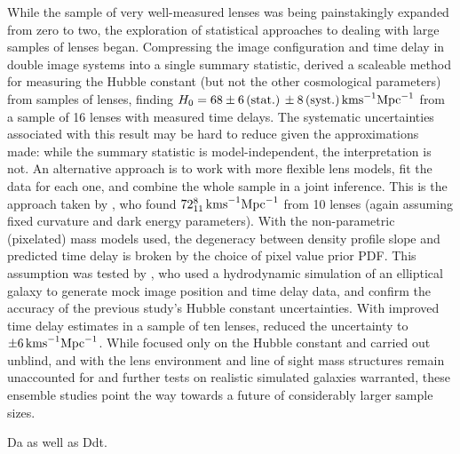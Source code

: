 While the sample of very well-measured lenses was being painstakingly
expanded from zero to two, the exploration of statistical approaches to
dealing with large samples of lenses began.  Compressing the image
configuration and time delay in double image systems into a single
summary statistic, \citet{Ogu07b} derived a scaleable  method for
measuring the Hubble constant (but not the other cosmological
parameters) from samples of lenses, finding
$H_0=68\pm6\,{\rm(stat.)}\,\pm8\,{\rm (syst.)}\,{\rm km s}^{-1}{\rm
Mpc}^{-1}$ from a sample of 16 lenses with measured time delays. The
systematic uncertainties associated with this result may be hard to
reduce given the approximations made: while the summary statistic is
model-independent, the  interpretation is not. An alternative approach
is to work with more flexible lens models, fit the data for each one,
and combine the whole sample in a joint inference.  This is the approach
taken by \citet{Sah++06}, who found  $72^{8}_{11}\,{\rm km s}^{-1}{\rm
Mpc}^{-1}$ from 10 lenses (again assuming fixed curvature and dark energy
parameters). With the  non-parametric (pixelated) mass
models used, the degeneracy between  density profile slope and predicted
time delay is broken by the choice  of pixel value prior PDF. This assumption was
tested by \citet{Rea++07}, who used a hydrodynamic simulation of an
elliptical galaxy to generate mock image position and time delay data,
and confirm the accuracy of the previous study's Hubble constant
uncertainties. With improved time delay estimates in a sample
of ten lenses, \citet{RK++2015} reduced the uncertainty to
$\pm6\,{\rm km s}^{-1}{\rm Mpc}^{-1}$. While focused only on the
Hubble constant and carried out unblind, and with the lens environment and
line of sight mass structures remain unaccounted for and further tests
on realistic simulated galaxies warranted, these ensemble studies
point the way towards a future of considerably larger sample sizes.


Da as well as Ddt.
